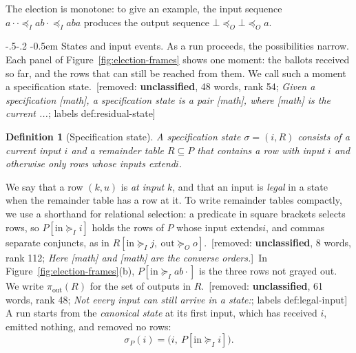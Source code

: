 \documentclass[sigconf]{cidr-2027}
\makeatletter
\newtheorem{definition}{Definition}
\theoremstyle{remark}
\renewcommand\paragraph{\@startsection{paragraph}{4}{\z@}%
  {-.5\baselineskip \@plus -2\p@ \@minus -.2\p@}%
  {-0.5em}%
  {\normalfont\bfseries}}
\newcommand{\InputOrd}{\preceq_I}
\newcommand{\OutputOrd}{\preceq_O}
\newcommand{\InputGe}{\succeq_I}
\newcommand{\OutputGe}{\succeq_O}
\newcommand{\inrel}{extends\xspace}          %
\newcommand{\inrelbase}{extend\xspace}       %
\newcommand{\removednote}[1]{{\color{cutred}\footnotesize\,[removed: #1]\,}}
\makeatother
\begin{document}
The election is monotone: to give an example, the input sequence
$a\cdot\cdot\InputOrd ab\cdot\InputOrd aba$ produces the output sequence
$\bot\OutputOrd\bot\OutputOrd a$.

\paragraph{States and input events.}
As a run proceeds, the possibilities narrow. Each panel of
Figure~\ref{fig:election-frames} shows one moment: the ballots received so
far, and the rows that can still be reached from them. We call such a moment
a specification state. \removednote{\textbf{unclassified}, 48 words, rank 54; \textit{Given a specification [math], a specification state is a pair [math], where [math] is the current ...}; labels def:residual-state}

\begin{definition}[Specification state]
\label{def:state}
\textcolor{newblue}{A \emph{specification state} $\sigma=(i,R)$ consists of a \emph{current input}
$i$ and a \emph{remainder table} $R\subseteq P$ that contains a row with input
$i$ and otherwise only rows whose inputs \inrelbase $i$.}
\end{definition}


\textcolor{newblue}{We say that a row $(k,u)$ is
\emph{at input} $k$, and that an input is
\emph{legal} in a state when the remainder table has a row at it.} \textcolor{newblue}{To write
remainder tables compactly, we use a shorthand for relational selection: a
predicate in square brackets selects rows, so $P[\mathrm{in}\InputGe i]$ holds
the rows of $P$ whose input \inrel $i$, and commas separate conjuncts, as in
$R[\mathrm{in}\InputGe j,\ \mathrm{out}\OutputGe o]$.} \removednote{\textbf{unclassified}, 8 words, rank 112; \textit{Here [math] and [math] are the converse orders.}} \textcolor{newblue}{In
Figure~\ref{fig:election-frames}(b), $P[\mathrm{in}\InputGe ab\cdot]$ is the
three rows not grayed out.} We write
$\pi_{\mathrm{out}}(R)$ for the set of outputs in $R$. \removednote{\textbf{unclassified}, 61 words, rank 48; \textit{Not every input can still arrive in a state:}; labels def:legal-input} \textcolor{newblue}{A run starts from the
\emph{canonical state} at its first input, which has received $i$, emitted
nothing, and removed no rows:}
\begin{equation}
  \sigma_P(i)=\bigl(i,\ P[\mathrm{in}\InputGe i]\bigr).
    \label{eq:canonical-state}
\end{equation}
\end{document}
